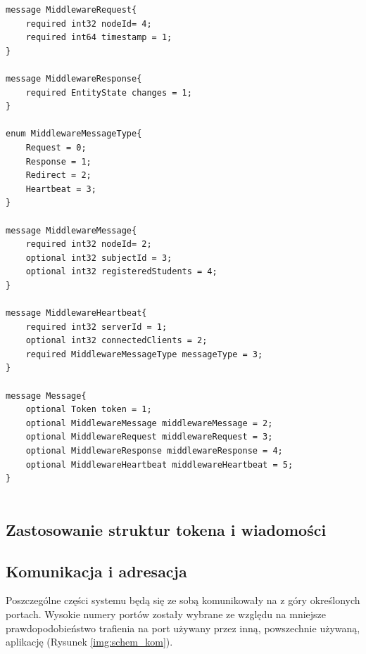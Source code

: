 {\begin{lstlisting}
message MiddlewareRequest{
	required int32 nodeId= 4;
    required int64 timestamp = 1;
}

message MiddlewareResponse{
    required EntityState changes = 1;
}

enum MiddlewareMessageType{
    Request = 0;
    Response = 1;
    Redirect = 2;
    Heartbeat = 3;
}

message MiddlewareMessage{
	required int32 nodeId= 2;
    optional int32 subjectId = 3;
    optional int32 registeredStudents = 4;    
}

message MiddlewareHeartbeat{ 
    required int32 serverId = 1;
    optional int32 connectedClients = 2;
    required MiddlewareMessageType messageType = 3;
}

message Message{
    optional Token token = 1;
    optional MiddlewareMessage middlewareMessage = 2;
    optional MiddlewareRequest middlewareRequest = 3;
    optional MiddlewareResponse middlewareResponse = 4;
    optional MiddlewareHeartbeat middlewareHeartbeat = 5;
}


\end{lstlisting}

\subsection[Zastosowanie struktur tokena i wiadomości]{Zastosowanie struktur tokena i wiadomości}

\subsection[Komunikacja i adresacja]{Komunikacja i adresacja}

\par{Poszczególne części systemu będą się ze sobą komunikowały na z góry określonych portach. Wysokie numery portów zostały wybrane ze względu na mniejsze prawdopodobieństwo trafienia na port używany przez inną, powszechnie używaną, aplikację (Rysunek \ref{img:schem_kom}).}

}
